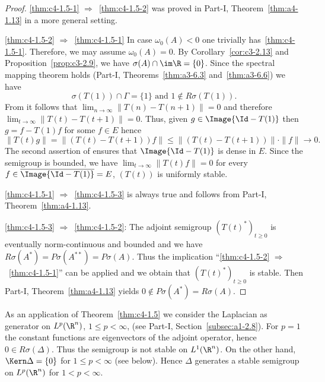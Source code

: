 \begin{proof}
\ref{thm:c4-1.5-1} $\Rightarrow$~\ref{thm:c4-1.5-2} was proved in Part-I, Theorem~\ref{thm:a4-1.13} in a more general setting.

\ref{thm:c4-1.5-2} $\Rightarrow$~\ref{thm:c4-1.5-1} In case $\omega_{0}(A) < 0$ one trivially has~\ref{thm:c4-1.5-1}.
Therefore, we may assume $\omega_{0}(A) = 0$.
By Corollary~\ref{cor:c3-2.13} and Proposition~\ref{prop:c3-2.9},  we have $\sigma(A) \cap \im\R = \{0\}$.
Since the spectral mapping theorem holds 
(\cf Part-I, Theorems~\ref{thm:a3-6.3} and~\ref{thm:a3-6.6}) we have
\begin{equation}\label{eq:c4-1.5}
\sigma(T(1)) \cap \Gamma = \{1\} \text{ and } 1 \notin R{\sigma}(T(1)).
\end{equation}
From  it follows that $\lim_{n \to \infty} \|T(n) - T(n+1)\| = 0$ and therefore $\lim_{t \to \infty} \|T(t) - T(t+1)\| = 0$.
Thus, given $g \in \Image{\Id - T(1)}$ then $g = f - T(1)f$ for some $f \in E$ hence 
\[
\|T(t)g\| = \|(T(t) - T(t+1))f\| \leq \|(T(t) - T(t+1))\| \cdot \|f\| \to 0.
\]
The second assertion of  ensures that $\Image{\Id - T(1)}$ is dense in $E$.
Since the semigroup is bounded, we have $\lim_{t \to \infty} \|T(t)f\| = 0$ for every $f \in \overline{\Image{\Id - T(1)}} = E$, \ie  $(T(t))$ is uniformly stable.

\ref{thm:c4-1.5-1} $\Rightarrow$~\ref{thm:c4-1.5-3} is always true and follows from Part-I, Theorem~\ref{thm:a4-1.13}.

\ref{thm:c4-1.5-3} $\Rightarrow$~\ref{thm:c4-1.5-2}:  
The adjoint semigroup $(T(t)^*)_{t \geq 0}$ is eventually norm-continuous and boun\-ded and we have $R{\sigma}(A^*) = P{\sigma}(A^{**}) = P{\sigma}(A)$.
Thus the implication \enquote{\ref{thm:c4-1.5-2} $\Rightarrow$~\ref{thm:c4-1.5-1}} can be applied and we obtain that $(T(t)^*)_{t \geq 0}$ is stable.
Then Part-I, Theorem~\ref{thm:a4-1.13} yields $0 \notin P{\sigma}(A^*) = R{\sigma}(A)$.
\end{proof}
As an application of Theorem~\ref{thm:c4-1.5}  we consider the Laplacian as generator on $L^{p}(\R^{n})$, $1 \leq p < \infty$, (see Part-I, Section~\ref{subsec:a1-2.8}).
For $p = 1$ the constant functions are eigenvectors of the adjoint operator, hence $0 \in R{\sigma}(\Delta)$.
Thus the semigroup is not stable on $L^{1}(\R^{n})$.
On the other hand, $\Kern\Delta =\{ 0 \}$ for $ 1 \leq p < \infty$ (see below). 
Hence $\Delta$ generates a stable semigroup on $L^{p}(\R^{n})$ for $1 < p < \infty$.

